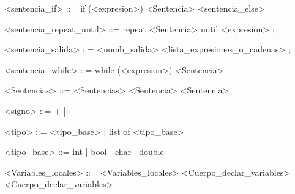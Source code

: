 \begin{grammar}
<sentencia_if> ::= if (<expresion>) <Sentencia> <sentencia_else>

<sentencia_repeat_until> ::= repeat <Sentencia> until <expresion> ;

<sentencia_salida> ::= <nomb_salida> <lista_expresiones_o_cadenas> ;

<sentencia_while> ::= while (<expresion>) <Sentencia>

<Sentencias> ::= <Sentencias> <Sentencia>
\alt <Sentencia>

<signo> ::= + | -

<tipo> ::= <tipo_base> | list of <tipo_base>

<tipo_base> ::= int | bool | char | double

<Variables_locales> ::= <Variables_locales> <Cuerpo_declar_variables>
\alt <Cuerpo_declar_variables>

\end{grammar}
